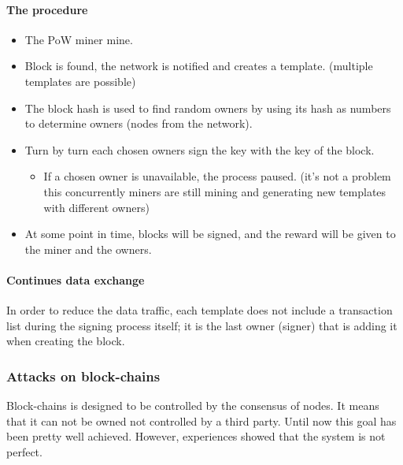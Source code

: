 \paragraph{The procedure}
\begin{itemize}
\item The PoW miner mine.
\item Block is found, the network is notified and creates a template. (multiple templates are possible)
\item The block hash is used to find random owners by using its hash as numbers to determine owners (nodes from the network).
\item Turn by turn each chosen owners sign the key with the key of the block.
\begin{itemize}
\item If a chosen owner is unavailable, the process paused. (it's not a problem this concurrently miners are still mining and generating new templates with different owners)
\end{itemize}
\item At some point in time, blocks will be signed, and the reward will be given to the miner and the owners.
\end{itemize}

\paragraph{Continues data exchange}
In order to reduce the data traffic, each template does not include a transaction list during the signing process itself; it is the last owner (signer) that is adding it when creating the block.

\subsubsection{Attacks on block-chains}
Block-chains is designed to be controlled by the consensus of nodes. It means that it can not be owned not controlled by a third party. Until now this goal has been pretty well achieved. However, experiences showed that the system is not perfect.

